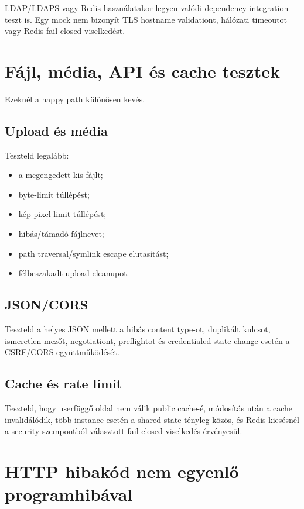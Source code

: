 LDAP/LDAPS vagy Redis használatakor legyen valódi dependency integration teszt is. Egy mock nem bizonyít TLS hostname validationt, hálózati timeoutot vagy Redis fail-closed viselkedést.

\section{Fájl, média, API és cache tesztek}

Ezeknél a happy path különösen kevés.

\subsection*{Upload és média}

Teszteld legalább:

\begin{itemize}
  \item a megengedett kis fájlt;
  \item byte-limit túllépést;
  \item kép pixel-limit túllépést;
  \item hibás/támadó fájlnevet;
  \item path traversal/symlink escape elutasítást;
  \item félbeszakadt upload cleanupot.
\end{itemize}

\subsection*{JSON/CORS}

Teszteld a helyes JSON mellett a hibás content type-ot, duplikált kulcsot, ismeretlen mezőt,  negotiationt, preflightot és credentialed state change esetén a CSRF/CORS együttműködését.

\subsection*{Cache és rate limit}

Teszteld, hogy userfüggő oldal nem válik public cache-é, módosítás után a cache invalidálódik, több instance esetén a shared state tényleg közös, és Redis kiesésnél a security szempontból választott fail-closed viselkedés érvényesül.

\section{HTTP hibakód nem egyenlő programhibával}

